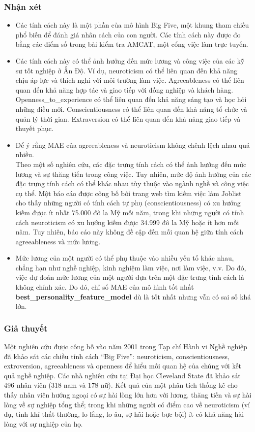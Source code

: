 \documentclass[]{article}
\begin{document}
\subsubsection{Nhận xét}
\begin{itemize}
  \item Các tính cách này là một phần của mô hình Big Five, một khung tham chiếu phổ biến để đánh giá nhân cách của con người. Các tính cách này được đo bằng các điểm số trong bài kiểm tra AMCAT, một cổng việc làm trực tuyến. \cite{kaggleEngineeringGraduate}
  \item Các tính cách này có thể ảnh hưởng đến mức lương và công việc của các kỹ sư tốt nghiệp ở Ấn Độ. Ví dụ, neuroticism có thể liên quan đến khả năng chịu áp lực và thích nghi với môi trường làm việc. Agreeableness có thể liên quan đến khả năng hợp tác và giao tiếp với đồng nghiệp và khách hàng. Openness\_to\_experience có thể liên quan đến khả năng sáng tạo và học hỏi những điều mới. Conscientiousness có thể liên quan đến khả năng tổ chức và quản lý thời gian. Extraversion có thể liên quan đến khả năng giao tiếp và thuyết phục.
  \item Để ý rằng MAE của agreeableness và neuroticism không chênh lệch nhau quá nhiều. \\
  Theo một số nghiên cứu, các đặc trưng tính cách có thể ảnh hưởng đến mức lương và sự thăng tiến trong công việc. Tuy nhiên, mức độ ảnh hưởng của các đặc trưng tính cách có thể khác nhau tùy thuộc vào ngành nghề và công việc cụ thể. \cite{personalityTraitsPredict}
  Một báo cáo được công bố bởi trang web tìm kiếm việc làm Joblist cho thấy những người có tính cách tự phụ (conscientiousness) có xu hướng kiếm được ít nhất 75.000 đô la Mỹ mỗi năm, trong khi những người có tính cách neuroticism có xu hướng kiếm được 34.999 đô la Mỹ hoặc ít hơn mỗi năm. Tuy nhiên, báo cáo này không đề cập đến mối quan hệ giữa tính cách agreeableness và mức lương. \cite{personalityTraitsPredict2}
  \item Mức lương của một người có thể phụ thuộc vào nhiều yếu tố khác nhau, chẳng hạn như nghề nghiệp, kinh nghiệm làm việc, nơi làm việc, v.v. Do đó, việc dự đoán mức lương của một người dựa trên một đặc trưng tính cách là không chính xác. Do đó, chỉ sổ MAE của mô hình tốt nhất \textbf{best\_personality\_feature\_model} dù là tốt nhất nhưng vẫn có sai số khá lớn.
\end{itemize}

\subsubsection{Giả thuyết}
Một nghiên cứu được công bố vào năm 2001 trong Tạp chí Hành vi Nghề nghiệp đã khảo sát các chiều tính cách “Big Five”: neuroticism, conscientiousness, extroversion, agreeableness và openness để hiểu mối quan hệ của chúng với kết quả nghề nghiệp. Các nhà nghiên cứu tại Đại học Cleveland State đã khảo sát 496 nhân viên (318 nam và 178 nữ). Kết quả của một phân tích thống kê cho thấy nhân viên hướng ngoại có sự hài lòng lớn hơn với lương, thăng tiến và sự hài lòng về sự nghiệp tổng thể; trong khi những người có điểm cao về neuroticism (ví dụ, tính khí thất thường, lo lắng, lo âu, sợ hãi hoặc bực bội) ít có khả năng hài lòng với sự nghiệp của họ. 
\end{document}
